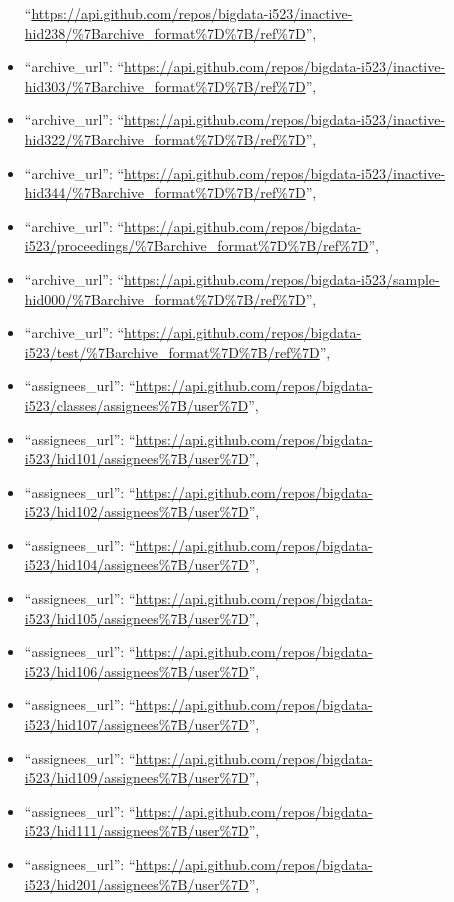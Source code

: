 \begin{itemize}
  ``\url{https://api.github.com/repos/bigdata-i523/inactive-hid238/\%7Barchive_format\%7D\%7B/ref\%7D}'',
\item
  ``archive\_url'':
  ``\url{https://api.github.com/repos/bigdata-i523/inactive-hid303/\%7Barchive_format\%7D\%7B/ref\%7D}'',
\item
  ``archive\_url'':
  ``\url{https://api.github.com/repos/bigdata-i523/inactive-hid322/\%7Barchive_format\%7D\%7B/ref\%7D}'',
\item
  ``archive\_url'':
  ``\url{https://api.github.com/repos/bigdata-i523/inactive-hid344/\%7Barchive_format\%7D\%7B/ref\%7D}'',
\item
  ``archive\_url'':
  ``\url{https://api.github.com/repos/bigdata-i523/proceedings/\%7Barchive_format\%7D\%7B/ref\%7D}'',
\item
  ``archive\_url'':
  ``\url{https://api.github.com/repos/bigdata-i523/sample-hid000/\%7Barchive_format\%7D\%7B/ref\%7D}'',
\item
  ``archive\_url'':
  ``\url{https://api.github.com/repos/bigdata-i523/test/\%7Barchive_format\%7D\%7B/ref\%7D}'',
\item
  ``assignees\_url'':
  ``\url{https://api.github.com/repos/bigdata-i523/classes/assignees\%7B/user\%7D}'',
\item
  ``assignees\_url'':
  ``\url{https://api.github.com/repos/bigdata-i523/hid101/assignees\%7B/user\%7D}'',
\item
  ``assignees\_url'':
  ``\url{https://api.github.com/repos/bigdata-i523/hid102/assignees\%7B/user\%7D}'',
\item
  ``assignees\_url'':
  ``\url{https://api.github.com/repos/bigdata-i523/hid104/assignees\%7B/user\%7D}'',
\item
  ``assignees\_url'':
  ``\url{https://api.github.com/repos/bigdata-i523/hid105/assignees\%7B/user\%7D}'',
\item
  ``assignees\_url'':
  ``\url{https://api.github.com/repos/bigdata-i523/hid106/assignees\%7B/user\%7D}'',
\item
  ``assignees\_url'':
  ``\url{https://api.github.com/repos/bigdata-i523/hid107/assignees\%7B/user\%7D}'',
\item
  ``assignees\_url'':
  ``\url{https://api.github.com/repos/bigdata-i523/hid109/assignees\%7B/user\%7D}'',
\item
  ``assignees\_url'':
  ``\url{https://api.github.com/repos/bigdata-i523/hid111/assignees\%7B/user\%7D}'',
\item
  ``assignees\_url'':
  ``\url{https://api.github.com/repos/bigdata-i523/hid201/assignees\%7B/user\%7D}'',

\end{itemize}
